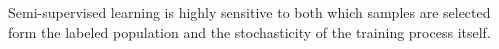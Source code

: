 \documentclass[10pt,twocolumn,letterpaper]{article}
\begin{document}
Semi-supervised learning is highly sensitive to both which samples are selected form the labeled population \cite{sohn2020fixmatch} and the stochasticity of the training process itself.



\end{document}
